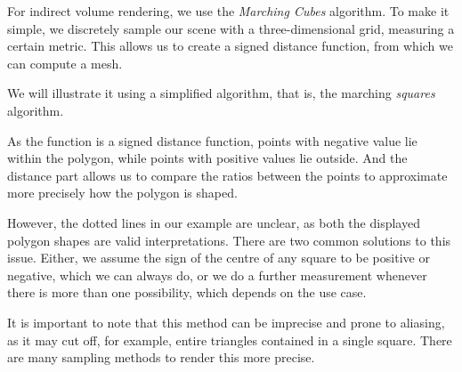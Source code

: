 \documentclass{panikzettel}
\begin{document}
\begin{halfboxl}
For indirect volume rendering, we use the \emph{Marching Cubes} algorithm. To make it simple, we discretely sample our scene with a three-dimensional grid, measuring a certain metric. This allows us to create a signed distance function, from which we can compute a mesh.

We will illustrate it using a simplified algorithm, that is, the marching \emph{squares} algorithm.

As the function is a signed distance function, points with negative value lie within the polygon, while points with positive values lie outside. And the distance part allows us to compare the ratios between the points to approximate more precisely how the polygon is shaped.

However, the dotted lines in our example are unclear, as both the displayed polygon shapes are valid interpretations. There are two common solutions to this issue. Either, we assume the sign of the centre of any square to be positive or negative, which we can always do, or we do a further measurement whenever there is more than one possibility, which depends on the use case.

It is important to note that this method can be imprecise and prone to aliasing, as it may cut off, for example, entire triangles contained in a single square. There are many sampling methods to render this more precise.
\end{halfboxl}%
\end{document}
